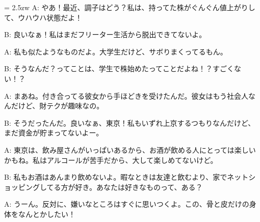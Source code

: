 \documentclass[11pt]{amsart}
\title{}
\author{}
\newenvironment{hangall}[1]{\hangindent = 2.5zw\everypar{\hangindent = 2.5zw}}{}
\begin{document}
\maketitle
\begin{hangall}{}%
A: やあ！最近、調子はどう？私は、持ってた株がぐんぐん値上がりして、ウハウハ状態だよ！



B: 良いなぁ！私はまだフリーター生活から脱出できてないよ。



A: 私も似たようなものだよ。大学生だけど、サボりまくってるもん。



B: そうなんだ？ってことは、学生で株始めたってことだよね！？すごくない！？



A: まあね。付き合ってる彼女から手ほどきを受けたんだ。彼女はもう社会人なんだけど、財テクが趣味なの。



B: そうだったんだ。良いなぁ、東京！私もいずれ上京するつもりなんだけど、まだ資金が貯まってないよー。



A: 東京は、飲み屋さんがいっぱいあるから、お酒が飲める人にとっては楽しいかもね。私はアルコールが苦手だから、大して楽しめてないけど。



B: 私もお酒はあんまり飲めないよ。暇なときは友達と飲むより、家でネットショッピングしてる方が好き。あなたは好きなものって、ある？



A: うーん。反対に、嫌いなところはすぐに思いつくよ。この、骨と皮だけの身体をなんとかしたい！\end{hangall}
\end{document}
